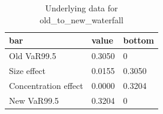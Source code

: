 \begin{table}[htbp]
\centering
\caption{Underlying data for old_to_new_waterfall}
\label{tab:old_to_new_waterfall_data}
\begin{tabular}{lll}
\toprule
\textbf{bar} & \textbf{value} & \textbf{bottom} \\
\midrule
Old VaR99.5 & 0.3050 & 0 \\
Size effect & 0.0155 & 0.3050 \\
Concentration effect & 0.0000 & 0.3204 \\
New VaR99.5 & 0.3204 & 0 \\
\bottomrule
\end{tabular}
\end{table}
